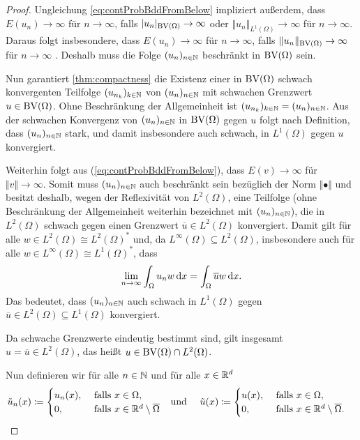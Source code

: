 \begin{proof}
  Ungleichung \eqref{eq:contProbBddFromBelow} impliziert außerdem, dass
  $E(u_n)\to\infty$ für $n\to\infty$, falls $|u_n|_{\textup{BV}(\Omega)}\to\infty$ oder
  $\Vert u_n\Vert_{L^1(\Omega)}\to\infty$ für $n\to\infty$. 
  Daraus folgt insbesondere, dass $E(u_n)\to\infty$ für $n\to\infty$, falls
  $\Vert u_n\Vert_{\textup{BV}(\Omega)}\to\infty$ für $n\to\infty$ .
  Deshalb muss die Folge $(u_n)_{n\in\mathbb{N}}$ beschränkt in $\textup{BV}(\Omega)$ sein.

  Nun garantiert \cref{thm:compactness} die Existenz einer in $\textup{BV}(\Omega)$
  schwach konvergenten Teilfolge $(u_{n_k})_{k\in\mathbb{N}}$ von $(u_n)_{n\in\mathbb{N}}$
  mit schwachen Grenzwert $u\in\textup{BV}(\Omega)$. 
  Ohne Beschränkung der Allgemeinheit ist
  $(u_{n_k})_{k\in\mathbb{N}}=(u_n)_{n\in\mathbb{N}}$.
  Aus der schwachen Konvergenz von $(u_n)_{n\in\mathbb{N}}$ in $\textup{BV}(\Omega)$ gegen
  $u$ folgt nach Definition, dass $(u_n)_{n\in\mathbb{N}}$ stark, und damit
  insbesondere auch schwach, in $L^1(\Omega)$ gegen $u$ konvergiert.

  Weiterhin folgt aus (\ref{eq:contProbBddFromBelow}), dass
  $E(v)\rightarrow\infty$ für $\Vert v\Vert\rightarrow\infty$. 
  Somit muss $(u_n)_{n\in\mathbb{N}}$ auch beschränkt sein bezüglich der Norm
  $\Vert\bullet\Vert$ und besitzt deshalb, wegen der Reflexivität von
  $L^2(\Omega)$, eine Teilfolge (ohne Beschränkung der Allgemeinheit weiterhin
  bezeichnet mit $(u_n)_{n\in\mathbb{N}}$), die in $L^2(\Omega)$ schwach gegen einen
  Grenzwert $\overline{u}\in L^2(\Omega)$ konvergiert. 
  Damit gilt für alle $w\in L^2(\Omega)\cong L^2(\Omega)^\ast$ und, da
  $L^\infty(\Omega)\subseteq L^2(\Omega)$, insbesondere auch für alle $w\in
  L^\infty(\Omega)\cong L^1(\Omega)^\ast$, dass 
  \begin{align*}
    \lim_{n\to\infty}\int_\Omega u_n w\,\mathrm{d}x =\int_\Omega \overline{u} w\,\mathrm{d}x.
  \end{align*}
  Das bedeutet, dass $(u_n)_{n\in\mathbb{N}}$ auch schwach in $L^1(\Omega)$ gegen
  $\overline{u}\in L^2(\Omega)\subseteq L^1(\Omega)$ konvergiert. 

  Da schwache Grenzwerte eindeutig bestimmt sind, gilt insgesamt $u=\overline u
  \in L^2(\Omega)$, das heißt $u\in\textup{BV}(\Omega)\cap
  L^2(\Omega)$.

  Nun definieren wir für alle
  $n\in\mathbb{N}$ und für alle 
  $x\in\mathbb{R}^d$
  \begin{align*}
    \tilde{u}_n(x)
    &\coloneqq
    \begin{cases}
      u_n(x),  &\text{ falls } x\in\Omega,\\
      0,     &\text{ falls } x\in\mathbb{R}^d\setminus\overline\Omega
    \end{cases} 
    &&\text{und }
    &\tilde{u}(x)
    &\coloneqq
    \begin{cases}
      u(x),  &\text{ falls } x\in\Omega,\\
      0,     &\text{ falls } x\in\mathbb{R}^d\setminus\overline\Omega.
    \end{cases} 
  \end{align*}


\end{proof}
